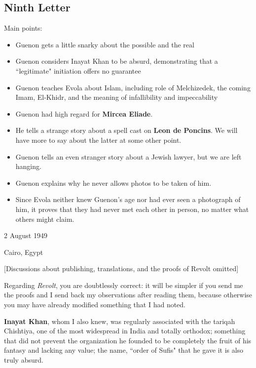 \subsection{Ninth Letter}

\begin{quotex}
Main points:

\begin{itemize}
\item Guenon gets a little snarky about the possible and the real 
\item Guenon considers Inayat Khan to be absurd, demonstrating that a ``legitimate" initiation offers no guarantee 
\item Guenon teaches Evola about Islam, including role of Melchizedek, the coming Imam, El-Khidr, and the meaning of infallibility and impeccability 
\item Guenon had high regard for \textbf{Mircea Eliade}. 
\item He tells a strange story about a spell cast on \textbf{Leon de Poncins}. We will have more to say about the latter at some other point. 
\item Guenon tells an even stranger story about a Jewish lawyer, but we are left hanging. 
\item Guenon explains why he never allows photos to be taken of him. 
\item Since Evola neither knew Guenon's age nor had ever seen a photograph of him, it proves that they had never met each other in person, no matter what others might claim. 
\end{itemize}
\end{quotex}

2 August 1949

Cairo, Egypt

[Discussions about publishing, translations, and the proofs of Revolt omitted]

Regarding \emph{Revolt}, you are doubtlessly correct: it will be simpler if you send me the proofs and I send back my observations after reading them, because otherwise you may have already modified something that I had noted.

\textbf{Inayat Khan}, whom I also knew, was regularly associated with the tariqah Chishtiya, one of the most widespread in India and totally orthodox; something that did not prevent the organization he founded to be completely the fruit of his fantasy and lacking any value; the name, ``order of Sufis" that he gave it is also truly absurd.

